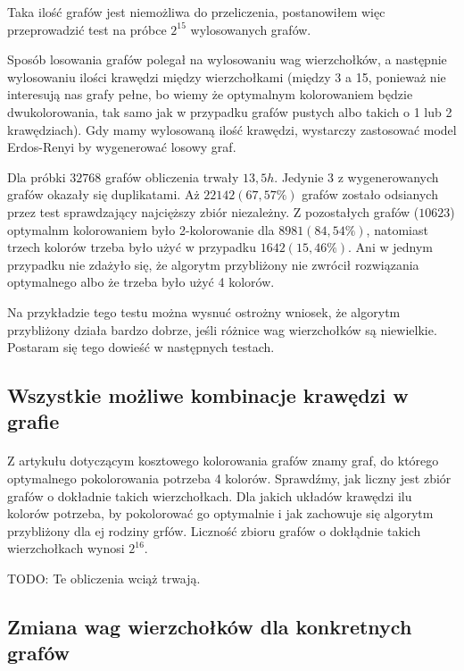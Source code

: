 \documentclass{article}
\begin{document}
Taka ilość grafów jest niemożliwa do przeliczenia, postanowiłem więc przeprowadzić test na próbce $2^15$ wylosowanych grafów.

Sposób losowania grafów polegał na wylosowaniu wag wierzchołków, a następnie wylosowaniu ilości krawędzi między wierzchołkami (między 3 a 15, ponieważ nie interesują nas grafy pełne, bo wiemy że optymalnym kolorowaniem będzie dwukolorowania, tak samo jak w przypadku grafów pustych albo takich o 1 lub 2 krawędziach). Gdy mamy wylosowaną ilość krawędzi, wystarczy zastosować model Erdos-Renyi by wygenerować losowy graf.

Dla próbki $32768$ grafów obliczenia trwały $13,5h$. Jedynie $3$ z wygenerowanych grafów okazały się duplikatami. Aż $22142 (67,57\%)$ grafów zostało odsianych przez test sprawdzający najcięższy zbiór niezależny. Z pozostałych grafów ($10623$) optymalnm kolorowaniem było 2-kolorowanie dla $8981 (84,54\%)$, natomiast trzech kolorów trzeba było użyć w przypadku $1642 (15,46\%)$. Ani w jednym przypadku nie zdażyło się, że algorytm przybliżony nie zwrócił rozwiązania optymalnego albo że trzeba było użyć 4 kolorów.

Na przykładzie tego testu można wysnuć ostrożny wniosek, że algorytm przybliżony działa bardzo dobrze, jeśli różnice wag wierzchołków są niewielkie. Postaram się tego dowieść w następnych testach.

\subsection{Wszystkie możliwe kombinacje krawędzi w grafie}

\paragraph{} Z artykułu dotyczącym kosztowego kolorowania grafów \cite{kubale-pikies19} znamy graf, do którego optymalnego pokolorowania potrzeba 4 kolorów. Sprawdźmy, jak liczny jest zbiór grafów o dokładnie takich wierzchołkach. Dla jakich układów krawędzi ilu kolorów potrzeba, by pokolorować go optymalnie i jak zachowuje się algorytm przybliżony dla ej rodziny grfów. Liczność zbioru grafów o dokłądnie takich wierzchołkach wynosi $2^{16}$.

TODO: Te obliczenia wciąż trwają.

\subsection{Zmiana wag wierzchołków dla konkretnych grafów}
\end{document}
